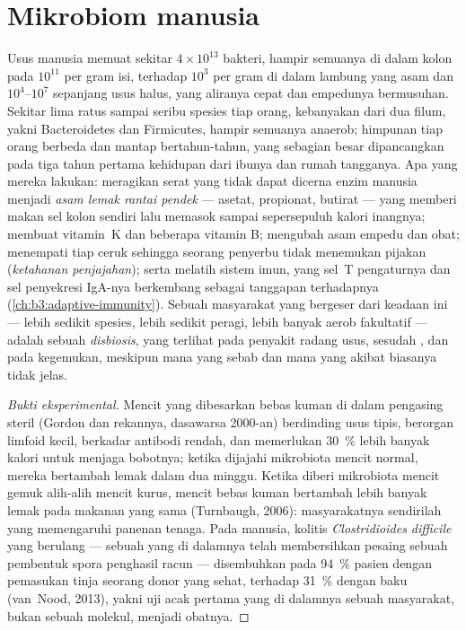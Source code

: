 \section{Mikrobiom manusia}

\begin{definition}\label{def:b3:microbiomes:gut}
%
Usus manusia memuat sekitar $4\times 10^{13}$ bakteri, hampir semuanya di dalam
kolon pada $10^{11}$ per gram isi, terhadap $10^{3}$ per gram di dalam
lambung yang asam dan $10^{4}$--$10^{7}$ sepanjang usus halus, yang
aliranya cepat dan empedunya bermusuhan. Sekitar lima ratus sampai seribu
spesies tiap orang, kebanyakan dari dua filum, yakni Bacteroidetes dan
Firmicutes, hampir semuanya anaerob; himpunan tiap orang berbeda dan
mantap bertahun-tahun, yang sebagian besar dipancangkan pada tiga tahun pertama
kehidupan dari ibunya dan rumah tangganya. Apa yang mereka lakukan: meragikan
serat yang tidak dapat dicerna enzim manusia menjadi \emph{asam lemak rantai
pendek} --- asetat, propionat, butirat --- yang memberi makan sel kolon sendiri
lalu memasok sampai sepersepuluh kalori inangnya; membuat vitamin~K dan
beberapa vitamin B; mengubah asam empedu dan obat; menempati tiap ceruk
sehingga seorang penyerbu tidak menemukan pijakan (\emph{ketahanan
penjajahan}); serta melatih sistem imun, yang sel~T pengaturnya dan sel
penyekresi IgA-nya berkembang sebagai tanggapan terhadapnya
(\cref{ch:b3:adaptive-immunity}). Sebuah masyarakat yang bergeser dari keadaan
ini --- lebih sedikit spesies, lebih sedikit peragi, lebih banyak aerob
fakultatif --- adalah sebuah \emph{disbiosis}, yang terlihat pada penyakit
radang usus, sesudah , dan pada kegemukan, meskipun mana yang sebab
dan mana yang akibat biasanya tidak jelas.
\end{definition}

\begin{proof}[Bukti eksperimental]
Mencit yang dibesarkan bebas kuman di dalam pengasing steril (Gordon dan
rekannya, dasawarsa 2000-an) berdinding usus tipis, berorgan limfoid kecil,
berkadar antibodi rendah, dan memerlukan \qty{30}{\%} lebih banyak kalori untuk
menjaga bobotnya; ketika dijajahi mikrobiota mencit normal, mereka bertambah
lemak dalam dua minggu. Ketika diberi mikrobiota mencit gemuk alih-alih mencit
kurus, mencit bebas kuman bertambah lebih banyak lemak pada makanan yang sama
(Turnbaugh, 2006): masyarakatnya sendirilah yang memengaruhi panenan tenaga.
Pada manusia, kolitis \emph{Clostridioides difficile} yang berulang --- sebuah
 yang di dalamnya  telah membersihkan pesaing sebuah
pembentuk spora penghasil racun --- disembuhkan pada \qty{94}{\%} pasien dengan
pemasukan tinja seorang donor yang sehat, terhadap \qty{31}{\%} dengan
 baku (van~Nood, 2013), yakni uji acak pertama yang di dalamnya
sebuah masyarakat, bukan sebuah molekul, menjadi obatnya.
\end{proof}

